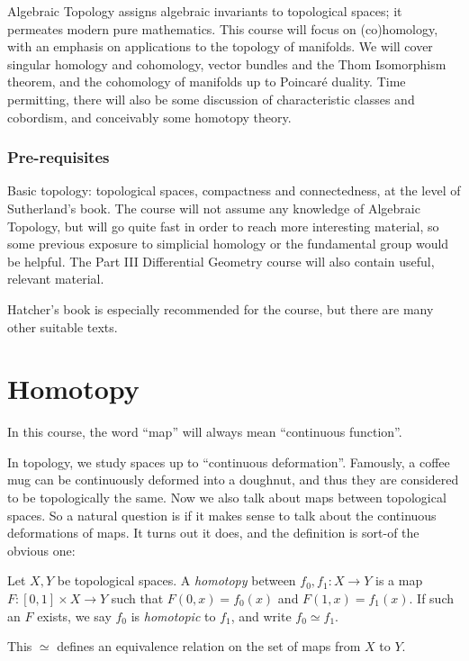 \documentclass[a4paper]{article}
\theoremstyle{definition}
\begin{document}
\maketitle
{\small
\setlength{\parindent}{0em}
\setlength{\parskip}{1em}

Algebraic Topology assigns algebraic invariants to topological spaces; it permeates modern pure mathematics. This course will focus on (co)homology, with an emphasis on applications to the topology of manifolds. We will cover singular homology and cohomology, vector bundles and the Thom Isomorphism theorem, and the cohomology of manifolds up to Poincar\'e duality. Time permitting, there will also be some discussion of characteristic classes and cobordism, and conceivably some homotopy theory.

\subsubsection*{Pre-requisites}

Basic topology: topological spaces, compactness and connectedness, at the level of Sutherland's book. The course will not assume any knowledge of Algebraic Topology, but will go quite fast in order to reach more interesting material, so some previous exposure to simplicial homology or the fundamental group would be helpful. The Part III Differential Geometry course will also contain useful, relevant material.

Hatcher's book is especially recommended for the course, but there are many other suitable texts.
}
\tableofcontents

\section{Homotopy}
In this course, the word ``map'' will always mean ``continuous function''.

In topology, we study spaces up to ``continuous deformation''. Famously, a coffee mug can be continuously deformed into a doughnut, and thus they are considered to be topologically the same. Now we also talk about maps between topological spaces. So a natural question is if it makes sense to talk about the continuous deformations of maps. It turns out it does, and the definition is sort-of the obvious one:

\begin{defi}[Homotopy]
  Let $X, Y$ be topological spaces. A \emph{homotopy} between $f_0, f_1: X \to Y$ is a map $F: [0, 1] \times X \to Y$ such that $F(0, x) = f_0(x)$ and $F(1, x) = f_1(x)$. If such an $F$ exists, we say $f_0$ is \emph{homotopic} to $f_1$, and write $f_0 \simeq f_1$.

  This $\simeq$ defines an equivalence relation on the set of maps from $X$ to $Y$.
\end{defi}
\end{document}
